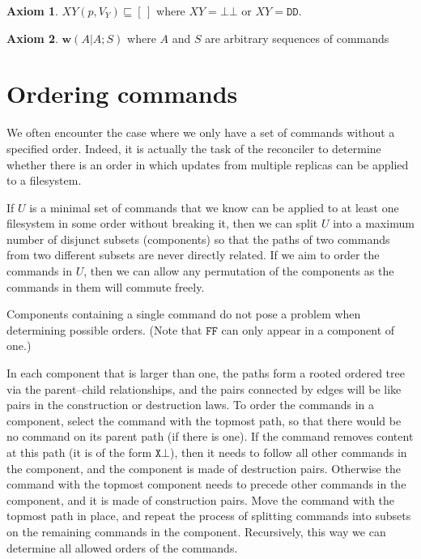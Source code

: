 \documentclass[12pt]{article}
\newcommand{\empt}{\bot}
\newcommand{\fscommand}[2]{{#1#2}}
\newcommand{\fsregcommandchar}[1]{\mathtt{#1}}
\newcommand{\fsregcommand}[2]{\fscommand{\fsregcommandchar{#1}}{\fsregcommandchar{#2}}}
\newcommand{\cbb}{\fsregcommand{\empt}{\empt}}
\newcommand{\cff}{\fsregcommand{F}{F}}
\newcommand{\cdd}{\fsregcommand{D}{D}}
\newcommand{\cxy}{\fscommand{X}{Y}}
\newcommand{\eqext}{\sqsubseteq}
\newcommand{\worksc}[2]{{\mathbf{w}}({#1}|{#2})}
\newcommand{\emptyseq}{[\,]}
\theoremstyle{definition}
\newtheorem{myax}{Axiom}
\begin{document}
\begin{myax}\label{ax_assert}
$\cxy(p,V_Y) \eqext \emptyseq$ where $\cxy=\cbb$ or $\cxy=\cdd$.
\end{myax}

\begin{myax}\label{worksextpostfix}
$\worksc{A}{A;S}$ where $A$ and $S$ are arbitrary sequences of commands
\end{myax}

\section{Ordering commands}

We often encounter the case where we only have a set of commands without a specified order.
Indeed, it is actually the task of the reconciler to determine whether there is an order
in which updates from multiple replicas can be applied to a filesystem.

If $U$ is a minimal set of commands
that we know can be applied to at least one filesystem in some order without breaking it,
then we can split $U$ into a maximum number of disjunct subsets
(components) so that the paths of two commands from two different subsets are never directly related.
If we aim to order the commands in $U$, then we can allow any permutation of 
the components as the commands in them will commute freely.

Components containing a single command do not pose a problem when determining
possible orders.
(Note that $\cff$ can only appear in a component of one.)

In each component that is larger than one, the paths 
form a rooted ordered tree via the parent--child relationships,
and the pairs connected by edges will be like pairs in the
construction or destruction laws.
To order the commands in a component,
select the command with the topmost path, so that there would be no command
on its parent path (if there is one). 
If the command removes content at this path (it is of the form $\fsregcommand{X}{\empt}$), then it
needs to follow all other commands in the component, and
the component is made of destruction pairs.
Otherwise the command with the topmost component needs to precede other commands
in the component, and it is made of construction pairs.
Move the command with the topmost path in place, and
repeat the process of splitting commands into subsets on the remaining commands
in the component. Recursively, this way we can determine all allowed orders of the commands.
\end{document}
